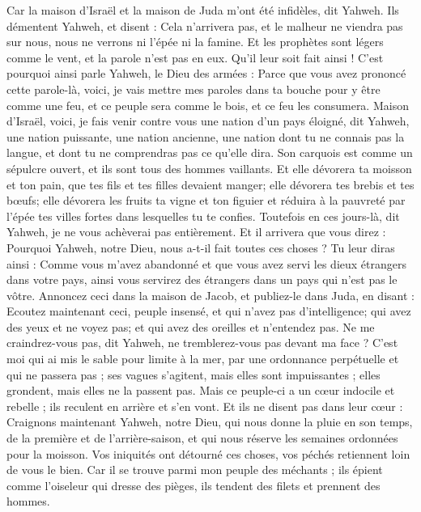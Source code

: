 \begin{multicols}{2}
Car la maison d'Israël et la maison de Juda m'ont été infidèles, dit Yahweh.
Ils démentent Yahweh, et disent : Cela n'arrivera pas, et le malheur ne viendra pas sur nous, nous ne verrons ni l'épée ni la famine.
Et les prophètes sont légers comme le vent, et la parole n'est pas en eux. Qu'il leur soit fait ainsi !
C'est pourquoi ainsi parle Yahweh, le Dieu des armées : Parce que vous avez prononcé cette parole-là, voici, je vais mettre mes paroles dans ta bouche pour y être comme une feu, et ce peuple sera comme le bois, et ce feu les consumera.
Maison d'Israël, voici, je fais venir contre vous une nation d'un pays éloigné, dit Yahweh, une nation puissante, une nation ancienne, une nation dont tu ne connais pas la langue, et dont tu ne comprendras pas ce qu'elle dira.
Son carquois est comme un sépulcre ouvert, et ils sont tous des hommes vaillants.
Et elle dévorera ta moisson et ton pain, que tes fils et tes filles devaient manger; elle dévorera tes brebis et tes bœufs; elle dévorera les fruits ta vigne et ton figuier et réduira à la pauvreté par l'épée tes villes fortes dans lesquelles tu te confies.
Toutefois en ces jours-là, dit Yahweh, je ne vous achèverai pas entièrement.
Et il arrivera que vous direz : Pourquoi Yahweh, notre Dieu, nous a-t-il fait toutes ces choses ? Tu leur diras ainsi : Comme vous m'avez abandonné et que vous avez servi les dieux étrangers dans votre pays, ainsi vous servirez des étrangers dans un pays qui n'est pas le vôtre.
Annoncez ceci dans la maison de Jacob, et publiez-le dans Juda, en disant :
Ecoutez maintenant ceci, peuple insensé, et qui n'avez pas d'intelligence; qui avez des yeux et ne voyez pas; et qui avez des oreilles et n'entendez pas.
Ne me craindrez-vous pas, dit Yahweh, ne tremblerez-vous pas devant ma face ? C'est moi qui ai mis le sable pour limite à la mer, par une ordonnance perpétuelle et qui ne passera pas ; ses vagues s'agitent, mais elles sont impuissantes ; elles grondent, mais elles ne la passent pas.
Mais ce peuple-ci a un cœur indocile et rebelle ; ils reculent en arrière et s'en vont.
Et ils ne disent pas dans leur cœur : Craignons maintenant Yahweh, notre Dieu, qui nous donne la pluie en son temps, de la première et de l'arrière-saison, et qui nous réserve les semaines ordonnées pour la moisson.
Vos iniquités ont détourné ces choses, vos péchés retiennent loin de vous le bien.
Car il se trouve parmi mon peuple des méchants ; ils épient comme l'oiseleur qui dresse des pièges, ils tendent des filets et prennent des hommes.

\end{multicols}
